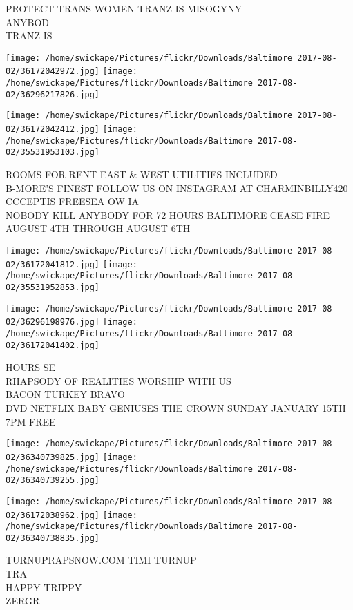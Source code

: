 \documentclass[10pt,letterpaper]{article}
\begin{document}
PROTECT TRANS WOMEN TRANZ IS MISOGYNY\\
ANYBOD\\
TRANZ IS
\pagebreak

\texttt{[image: /home/swickape/Pictures/flickr/Downloads/Baltimore 2017-08-02/36172042972.jpg]}
\texttt{[image: /home/swickape/Pictures/flickr/Downloads/Baltimore 2017-08-02/36296217826.jpg]}

\texttt{[image: /home/swickape/Pictures/flickr/Downloads/Baltimore 2017-08-02/36172042412.jpg]}
\texttt{[image: /home/swickape/Pictures/flickr/Downloads/Baltimore 2017-08-02/35531953103.jpg]}

ROOMS FOR RENT EAST \& WEST UTILITIES INCLUDED\\
B{-}MORE'S FINEST FOLLOW US ON INSTAGRAM AT CHARMINBILLY420\\
CCCEPTIS FREESEA OW IA\\
NOBODY KILL ANYBODY FOR 72 HOURS BALTIMORE CEASE FIRE AUGUST 4TH THROUGH AUGUST 6TH
\pagebreak

\texttt{[image: /home/swickape/Pictures/flickr/Downloads/Baltimore 2017-08-02/36172041812.jpg]}
\texttt{[image: /home/swickape/Pictures/flickr/Downloads/Baltimore 2017-08-02/35531952853.jpg]}

\texttt{[image: /home/swickape/Pictures/flickr/Downloads/Baltimore 2017-08-02/36296198976.jpg]}
\texttt{[image: /home/swickape/Pictures/flickr/Downloads/Baltimore 2017-08-02/36172041402.jpg]}

HOURS SE\\
RHAPSODY OF REALITIES WORSHIP WITH US\\
BACON TURKEY BRAVO\\
DVD NETFLIX BABY GENIUSES THE CROWN SUNDAY JANUARY 15TH 7PM FREE
\pagebreak

\texttt{[image: /home/swickape/Pictures/flickr/Downloads/Baltimore 2017-08-02/36340739825.jpg]}
\texttt{[image: /home/swickape/Pictures/flickr/Downloads/Baltimore 2017-08-02/36340739255.jpg]}

\texttt{[image: /home/swickape/Pictures/flickr/Downloads/Baltimore 2017-08-02/36172038962.jpg]}
\texttt{[image: /home/swickape/Pictures/flickr/Downloads/Baltimore 2017-08-02/36340738835.jpg]}

TURNUPRAPSNOW.COM TIMI TURNUP\\
TRA\\
HAPPY TRIPPY\\
ZERGR
\pagebreak
\end{document}
